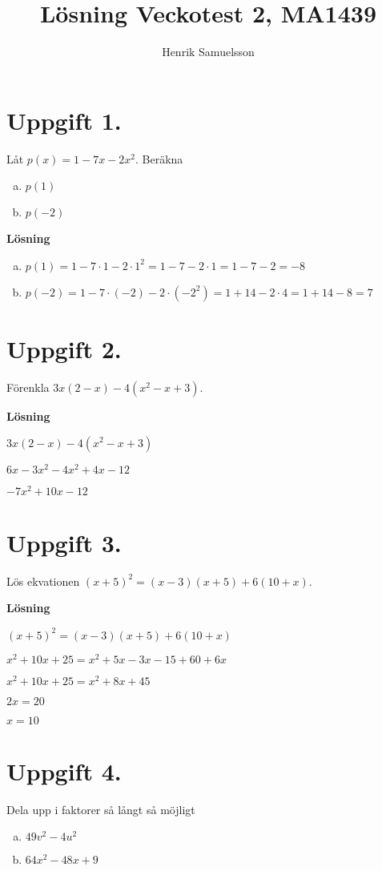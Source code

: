 \documentclass{article}
\begin{document}
\title{Lösning Veckotest 2, MA1439}
\author{Henrik Samuelsson}
\maketitle
\clearpage

\section*{Uppgift 1.} 
Låt $p(x)=1-7x-2x^2$. Beräkna

\begin{enumerate}[(a)]
\item $p(1)$
\item $p(-2)$
\end{enumerate}

\textbf{Lösning}

\begin{enumerate}[(a)]
\item $p(1) = 1 - 7 \cdot 1 - 2 \cdot 1^2 = 1 - 7 - 2 \cdot 1 = 1 - 7 - 2 = -8$
\item $p(-2)= 1 - 7 \cdot (-2) - 2 \cdot (-2^2) = 1 + 14 - 2\cdot 4 = 1 + 14 - 8 = 7$
\end{enumerate}

\section*{Uppgift 2.} 
Förenkla $3x(2-x)-4(x^2-x+3)$.

\textbf{Lösning}

$3x(2-x)-4(x^2-x+3)$

$6x-3x^2-4x^2+4x-12$

$-7x^2+10x-12$

\section*{Uppgift 3.} 
Lös ekvationen $(x+5)^2=(x-3)(x+5)+6(10+x)$.

\textbf{Lösning}

$(x+5)^2=(x-3)(x+5)+6(10+x)$

$x^2+10x+25=x^2+5x-3x-15+60+6x$

$x^2+10x+25=x^2+8x+45$

$2x=20$

$x=10$

\section*{Uppgift 4.} 
Dela upp i faktorer så långt så möjligt
\begin{enumerate}[(a)]
\item $49v^2-4u^2$
\item $64x^2-48x+9$
\end{enumerate}
\end{document}
